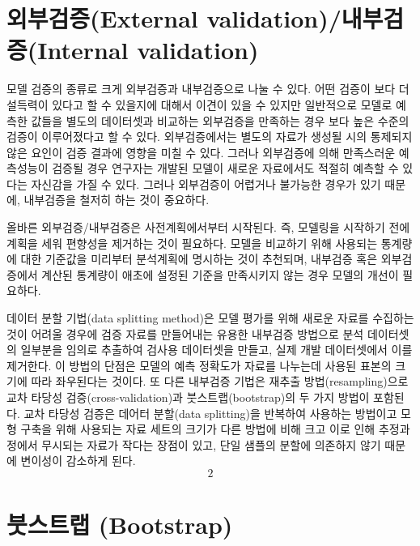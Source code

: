 \documentclass[
  10pt,
]{krantz}
\begin{document}
\hypertarget{uxc678uxbd80uxac80uxc99dexternal-validationuxb0b4uxbd80uxac80uxc99dinternal-validation}{%
\section{외부검증(External validation)/내부검증(Internal validation)}\label{uxc678uxbd80uxac80uxc99dexternal-validationuxb0b4uxbd80uxac80uxc99dinternal-validation}}

모델 검증의 종류로 크게 외부검증과 내부검증으로 나눌 수 있다. 어떤 검증이 보다 더 설득력이 있다고 할 수 있을지에 대해서
이견이 있을 수 있지만 일반적으로 모델로 예측한 값들을 별도의 데이터셋과 비교하는 외부검증을 만족하는 경우 보다 높은
수준의 검증이 이루어졌다고 할 수 있다. 외부검증에서는 별도의 자료가 생성될 시의 통제되지 않은 요인이 검증 결과에 영향을
미칠 수 있다. 그러나 외부검증에 의해 만족스러운 예측성능이 검증될 경우 연구자는 개발된 모델이 새로운 자료에서도 적절히
예측할 수 있다는 자신감을 가질 수 있다. 그러나 외부검증이 어렵거나 불가능한 경우가 있기 때문에, 내부검증을 철저히 하는
것이 중요하다.

올바른 외부검증/내부검증은 사전계획에서부터 시작된다. 즉, 모델링을 시작하기 전에 계획을 세워 편향성을 제거하는 것이 필요하다.
모델을 비교하기 위해 사용되는 통계량에 대한 기준값을 미리부터 분석계획에 명시하는 것이 추천되며, 내부검증 혹은 외부검증에서
계산된 통계량이 애초에 설정된 기준을 만족시키지 않는 경우 모델의 개선이 필요하다.

데이터 분할 기법(data splitting method)은 모델 평가를 위해 새로운 자료를 수집하는 것이 어려울 경우에 검증
자료를 만들어내는 유용한 내부검증 방법으로 분석 데이터셋의 일부분을 임의로 추출하여 검사용 데이터셋을 만들고, 실제 개발
데이터셋에서 이를 제거한다. 이 방법의 단점은 모델의 예측 정확도가 자료를 나누는데 사용된 표본의 크기에 따라 좌우된다는
것이다. 또 다른 내부검증 기법은 재추출 방법(resampling)으로 교차 타당성
검증(cross-validation)과 붓스트랩(bootstrap)의 두 가지 방법이 포함된다. 교차 타당성 검증은 데어터
분할(data splitting)을 반복하여 사용하는 방법이고 모형 구축을 위해 사용되는 자료 세트의 크기가 다른 방법에 비해
크고 이로 인해 추정과정에서 무시되는 자료가 작다는 장점이 있고, 단일 샘플의 분할에 의존하지 않기 때문에 변이성이
감소하게 된다. \[2\]

\hypertarget{uxbd93uxc2a4uxd2b8uxb7a9-bootstrap}{%
\section{붓스트랩 (Bootstrap)}\label{uxbd93uxc2a4uxd2b8uxb7a9-bootstrap}}
\end{document}
